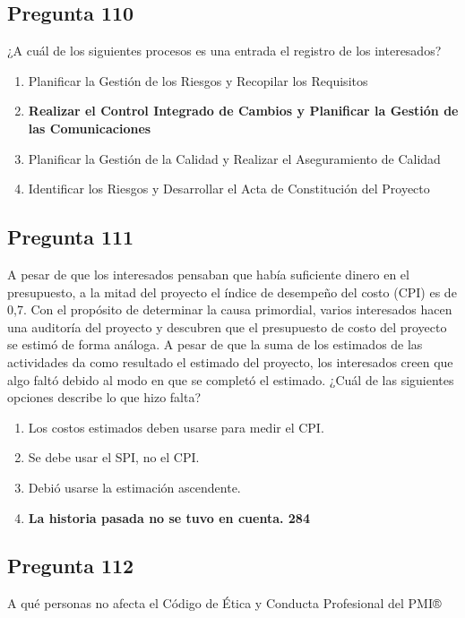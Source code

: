 \documentclass[11pt,a4paper]{article}
\begin{document}
\subsection*{Pregunta 110}
¿A cuál de los siguientes procesos es una entrada el registro de los interesados?

\begin{enumerate}[label=\alph*)]
  \item Planificar la Gestión de los Riesgos y Recopilar los Requisitos
  \item \textbf{Realizar el Control Integrado de Cambios y Planificar la Gestión de las Comunicaciones}
  \item Planificar la Gestión de la Calidad y Realizar el Aseguramiento de Calidad
  \item Identificar los Riesgos y Desarrollar el Acta de Constitución del Proyecto
\end{enumerate}

\subsection*{Pregunta 111}
A pesar de que los interesados pensaban que había suficiente dinero en el presupuesto, a la mitad del proyecto el índice de desempeño del costo (CPI) es de 0,7. Con el propósito de determinar la causa primordial, varios interesados hacen una auditoría del proyecto y descubren que el presupuesto de costo del proyecto se estimó de forma análoga. A pesar de que la suma de los estimados de las actividades da como resultado el estimado del proyecto, los interesados creen que algo faltó debido al modo en que se completó el estimado. ¿Cuál de las siguientes opciones describe lo que hizo falta?

\begin{enumerate}[label=\alph*)]
  \item Los costos estimados deben usarse para medir el CPI.
  \item Se debe usar el SPI, no el CPI.
  \item Debió usarse la estimación ascendente.
  \item \textbf{La historia pasada no se tuvo en cuenta. 284}
\end{enumerate}

\subsection*{Pregunta 112}
A qué personas no afecta el Código de Ética y Conducta Profesional del PMI®
\end{document}
